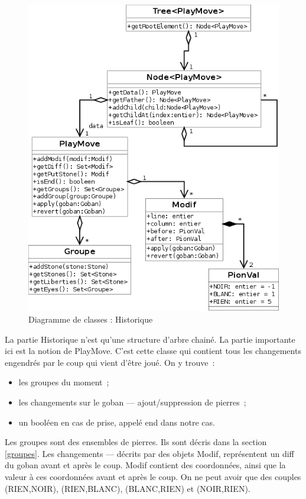 \documentclass[11pt,a4paper,titlepage,french]{article}
\begin{document}
					\begin{figure}[hbt]
						\begin{center}
							\includegraphics[width=\textwidth]{./history.png}
						\end{center}
						\caption{Diagramme de classes : Historique}
						\label{history}
					\end{figure}

				La partie Historique n'est qu'une structure d'arbre chainé. La partie importante ici est la notion de PlayMove. C'est cette classe qui contient tous les changements engendrés par le coup qui vient d'être joué. On y trouve~:
				\begin{itemize}
					\item les groupes du moment~;
					\item les changements sur le goban --- ajout/suppression de pierres~;
					\item un booléen en cas de prise, appelé end dans notre cas.
				\end{itemize}

				Les groupes sont des ensembles de pierres. Ils sont décris dans la section \ref{groupes}. Les changements --- décrits par des objets Modif, représentent un diff du goban avant et après le coup. Modif contient des coordonnées, ainsi que la valeur à ces coordonnées avant et après le coup. On ne peut avoir que des couples (RIEN,NOIR), (RIEN,BLANC), (BLANC,RIEN) et (NOIR,RIEN).
\end{document}
